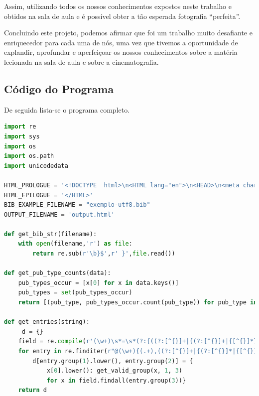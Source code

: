 \documentclass[11pt,a4paper]{report}
\begin{document}
Assim, utilizando todos os nossos conhecimentos expostos neste trabalho e obtidos na sala de aula e é possível obter a tão esperada fotografia “perfeita”.


Concluindo este projeto, podemos afirmar que foi um trabalho muito
desafiante e enriquecedor para cada uma de nós, uma vez que tivemos a
oportunidade de explandir, aprofundar e aperfeiçoar os nossos conhecimentos
sobre a matéria lecionada na sala de aula e sobre a cinematografia. 
\appendix
\begin{appendices}
\chapter{Código do Programa}
De seguida lista-se o programa completo.
\begin{lstlisting}[language=python]
import re
import sys
import os
import os.path
import unicodedata

HTML_PROLOGUE = '<!DOCTYPE  html>\n<HTML lang="en">\n<HEAD>\n<meta charset="utf-8">\n      <TITLE>Categories in BibTeX</TITLE>\n <script type="text/x-mathjax-config"> MathJax.Hub.Config({"extensions":["tex2jax.js"],"jax":["input/TeX","output/HTML-CSS"],"messageStyle":"none","tex2jax":{"processEnvironments":false,"processEscapes":true,"inlineMath":[["$","$"]],"displayMath":[["$$","$$"],["\\[","\\]"]]},"TeX":{"extensions":["AMSmath.js","AMSsymbols.js","noErrors.js","noUndefined.js"]},"HTML-CSS":{"availableFonts":["TeX"]}}); </script> <script type="text/javascript" async src="file:////home/useralef/.vscode/extensions/shd101wyy.markdown-preview-enhanced-0.6.1/node_modules/@shd101wyy/mume/dependencies/mathjax/MathJax.js" charset="UTF-8"></script>  </HEAD>\n'
HTML_EPILOGUE = '</HTML>'
BIB_EXAMPLE_FILENAME = "exemplo-utf8.bib"
OUTPUT_FILENAME = 'output.html'

def get_bib_str(filename):
    with open(filename,'r') as file:
        return re.sub(r'\b}$',r' }',file.read())

def get_pub_type_counts(data):
    pub_types_occur = [x[0] for x in data.keys()]
    pub_types = set(pub_types_occur)
    return [(pub_type, pub_types_occur.count(pub_type)) for pub_type in pub_types]

def get_entries(string):
     d = {}
    field = re.compile(r'(\w+)\s*=\s*(?:{((?:[^{}]+|{(?:[^{}]+|{[^{}]*})+})+)}|"([^"]+)"|(\d+))')
    for entry in re.finditer(r"@(\w+){(.+),((?:[^{}]+|{(?:[^{}]*|{[^{}]*})+})+)", string):
        d[entry.group(1).lower(), entry.group(2)] = {
            x[0].lower(): get_valid_group(x, 1, 3)
            for x in field.findall(entry.group(3))}
    return d


\end{lstlisting}
\end{appendices}
\end{document}
